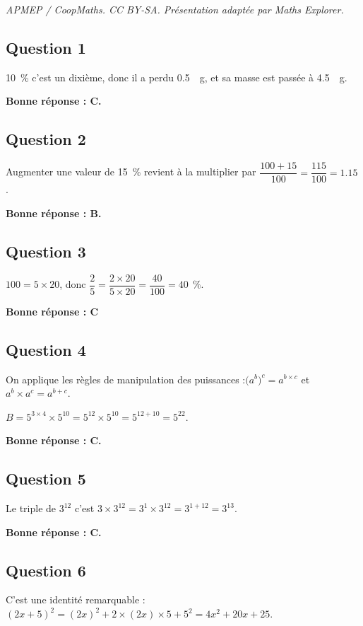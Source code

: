 \documentclass[10pt]{article}
\providecommand{\np}[2][]{{#2~#1}}
\begin{document}
\noindent\textit{APMEP / CoopMaths. CC BY-SA. Présentation adaptée par Maths Explorer.}\par\medskip
\subsection*{Question 1}
	10~\% c'est un dixième, donc il a perdu \np[~g]{0.5}, et sa masse est passée à \np[~g]{4.5}.

	\textbf{Bonne réponse : C.}

\subsection*{Question 2}
	Augmenter une valeur de 15~\% revient à la multiplier par \quad $\dfrac{100+15}{100} = \dfrac{115}{100} = \np{1.15}$.

	\textbf{Bonne réponse : B.}

\subsection*{Question 3}
	$100 = 5\times 20$, \quad donc \quad $\dfrac25 = \dfrac{2\times20}{5\times20} = \dfrac{40}{100} = \np[~\%]{40}$.

	\textbf{Bonne réponse : C}

\subsection*{Question 4}
	On applique les règles de manipulation des puissances  :\quad $\big(a^b\big)^c  =  a^{b \times c}$ \quad et  \quad $a^b \times a^c  =  a^{b + c}$.

	$B = 5^{3\times4}\times5^{10} = 5^{12}\times5^{10} = 5^{12+10} = 5^{22}$.

	\textbf{Bonne réponse : C.}

\subsection*{Question 5}
	Le triple de $3^{12}$ c'est \quad $3\times3^{12} = 3^1\times3^{12} = 3^{1+12} = 3^{13}$.

	\textbf{Bonne réponse : C.}

\subsection*{Question 6}
	C'est une identité remarquable :\quad $(2x+5)^2 = (2x)^2+2\times(2x)\times5+5^2 = 4x^2+20x+25$.
\end{document}
